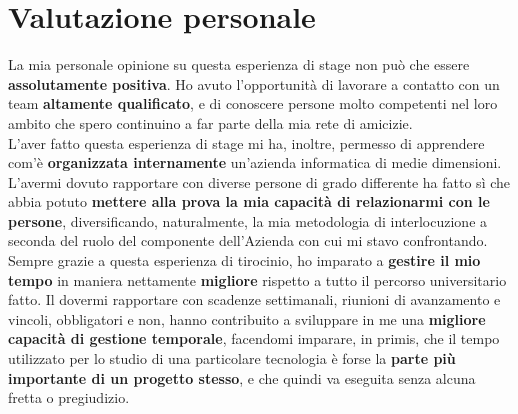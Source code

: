\section{Valutazione personale}
La mia personale opinione su questa esperienza di stage non può che essere \textbf{assolutamente positiva}. Ho avuto l'opportunità di lavorare a contatto con un team \textbf{altamente qualificato}, e di conoscere persone molto competenti nel loro ambito che spero continuino a far parte della mia rete di amicizie. \\
L'aver fatto questa esperienza di stage mi ha, inoltre, permesso di apprendere com'è \textbf{organizzata internamente} un'azienda informatica di medie dimensioni. L'avermi dovuto rapportare con diverse persone di grado differente ha fatto sì che abbia potuto\textbf{ mettere alla prova la mia capacità di relazionarmi con le persone}, diversificando, naturalmente, la mia metodologia di interlocuzione a seconda del ruolo del componente dell'Azienda con cui mi stavo confrontando.\\
Sempre grazie a questa esperienza di tirocinio, ho imparato a \textbf{gestire il mio tempo} in maniera nettamente \textbf{migliore} rispetto a tutto il percorso universitario fatto. Il dovermi rapportare con scadenze settimanali, riunioni di avanzamento e vincoli, obbligatori e non, hanno contribuito a sviluppare in me una \textbf{migliore capacità di gestione temporale}, facendomi imparare, in primis, che il tempo utilizzato per lo studio di una particolare tecnologia è forse la \textbf{parte più importante di un progetto stesso}, e che quindi va eseguita senza alcuna fretta o pregiudizio.







